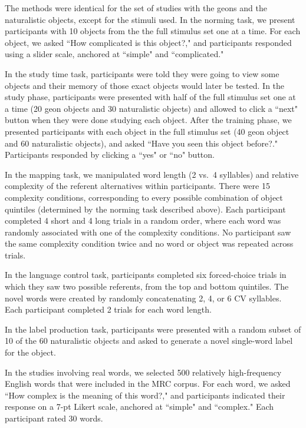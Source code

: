 \documentclass[12pt]{article}
\begin{document}
The methods were identical for the set of studies with the geons and the naturalistic objects, except for the stimuli used. 
In the norming task,  we present participants with 10 objects from the the full stimulus set one at a time. For each object, we asked ``How complicated is this object?," and participants responded using a slider scale, anchored at ``simple" and ``complicated."

In the study time task, participants were told they were going to view some objects and their memory of those exact objects would later be tested. In the study phase, participants were presented with half of the full stimulus set one at a time (20 geon objects and 30 naturalistic objects) and allowed to click a ``next" button when they were done studying each object. After the training phase, we presented participants with each object in the full stimulus set  (40 geon object and 60 naturalistic objects), and asked ``Have you seen this object before?." Participants responded by clicking a ``yes" or ``no" button.

In the mapping task, we manipulated word length (2 vs.\ 4 syllables) and relative complexity of the referent alternatives within participants.  There were 15 complexity conditions, corresponding to every possible combination of object quintiles (determined by the norming task described above). Each participant completed 4 short and 4 long trials in a random order, where each word was randomly associated with one of the complexity conditions. No participant saw the same complexity condition twice and no word or object was repeated across trials. 

In the language control task,  participants completed six forced-choice trials in which they saw two possible referents, from the top and bottom quintiles. The novel words were created by randomly concatenating 2, 4, or 6 CV syllables. Each participant completed 2 trials for each word length. 

In the label production task, participants were presented with a random subset of 10 of the 60 naturalistic objects and asked to generate a novel single-word label for the object. 

In the studies involving real words, we selected 500 relatively high-frequency English words that were included in the MRC corpus. For each word, we asked ``How complex is the meaning of this word?," and participants indicated their response on a 7-pt Likert scale, anchored at ``simple" and ``complex." Each participant rated 30 words.
\end{document}
